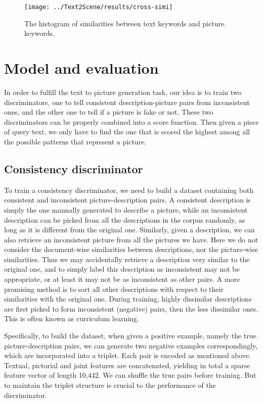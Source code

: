 \documentclass{article} %
\begin{document}
\begin{figure}[htbp]
	\centering
	\texttt{[image: ../Text2Scene/results/cross-simi]}
	\caption{The histogram of similarities between text keywords and picture keywords.}
	\label{fig: cross-simi}
\end{figure}

\section{Model and evaluation}
In order to fulfill the text to picture generation task, our idea is to train two discriminators, one to tell consistent description-picture pairs from inconsistent ones, and the other one to tell if a picture is fake or not. These two discriminators can be properly combined into a score function. Then given a piece of query text, we only have to find the one that is scored the highest among all the possible patterns that represent a picture.

\subsection{Consistency discriminator}
To train a consistency discriminator, we need to build a dataset containing both consistent and inconsistent picture-description pairs. A consistent description is simply the one manually generated to describe a picture, while an inconsistent description can be picked from all the descriptions in the corpus randomly, as long as it is different from the original one. Similarly, given a description, we can also retrieve an inconsistent picture from all the pictures we have. Here we do not consider the document-wise similarities between descriptions, nor the picture-wise similarities. Thus we may accidentally retrieve a description very similar to the original one, and to simply label this description as inconsistent may not be appropriate, or at least it may not be as inconsistent as other pairs. A more promising method is to sort all other descriptions with respect to their similarities with the original one. During training, highly dissimilar descriptions are first picked to form inconsistent (negative) pairs, then the less dissimilar ones. This is often known as curriculum learning. 

Specifically, to build the dataset, when given a positive example, namely the true picture-description pairs, we can generate two negative examples correspondingly, which are incorporated into a triplet. Each pair is encoded as mentioned above. Textual, pictorial and joint features are concatenated, yielding in total a sparse feature vector of length 10,442. We can shuffle the true pairs before training. But to maintain the triplet structure is crucial to the performance of the discriminator. 
\end{document}
